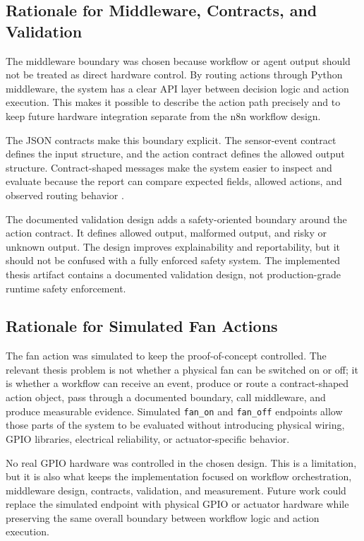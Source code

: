 \subsection{Rationale for Middleware, Contracts, and Validation}\label{subsec:rationale-middleware-contracts-validation}

The middleware boundary was chosen because workflow or agent output should not be treated as direct hardware control. By routing actions through Python middleware, the system has a clear API layer between decision logic and action execution. This makes it possible to describe the action path precisely and to keep future hardware integration separate from the n8n workflow design.

The JSON contracts make this boundary explicit. The sensor-event contract defines the input structure, and the action contract defines the allowed output structure. Contract-shaped messages make the system easier to inspect and evaluate because the report can compare expected fields, allowed actions, and observed routing behavior \cite{jsonSchemaDocs}.

The documented validation design adds a safety-oriented boundary around the action contract. It defines allowed output, malformed output, and risky or unknown output. The design improves explainability and reportability, but it should not be confused with a fully enforced safety system. The implemented thesis artifact contains a documented validation design, not production-grade runtime safety enforcement.

\subsection{Rationale for Simulated Fan Actions}\label{subsec:rationale-simulated-fan}

The fan action was simulated to keep the proof-of-concept controlled. The relevant thesis problem is not whether a physical fan can be switched on or off; it is whether a workflow can receive an event, produce or route a contract-shaped action object, pass through a documented boundary, call middleware, and produce measurable evidence. Simulated \texttt{fan\_on} and \texttt{fan\_off} endpoints allow those parts of the system to be evaluated without introducing physical wiring, GPIO libraries, electrical reliability, or actuator-specific behavior.

No real GPIO hardware was controlled in the chosen design. This is a limitation, but it is also what keeps the implementation focused on workflow orchestration, middleware design, contracts, validation, and measurement. Future work could replace the simulated endpoint with physical GPIO or actuator hardware while preserving the same overall boundary between workflow logic and action execution.

